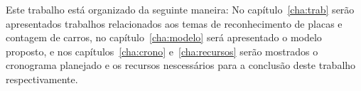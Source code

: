 Este trabalho está organizado da seguinte maneira: No capítulo~\ref{cha:trab}
serão apresentados trabalhos relacionados aos temas de reconhecimento de placas
e contagem de carros, no capítulo~\ref{cha:modelo} será apresentado o modelo
proposto, e nos capítulos~\ref{cha:crono}  e~\ref{cha:recursos} serão mostrados
o cronograma planejado e os recursos nescessários para a conclusão deste
trabalho respectivamente.

